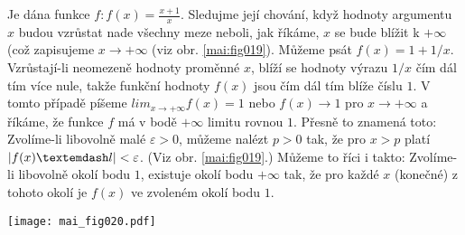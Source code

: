 \wikitextrule
\begin{example}\label{MAI:exam031}
  Je dána funkce \(f: f(x) = \frac{x + 1}{x}\). Sledujme její chování, když hodnoty argumentu \(x\) 
  budou vzrůstat nade všechny meze neboli, jak říkáme, \(x\) se bude blížit k \(+\infty\) (což 
  zapisujeme \(x \to + \infty\) (viz obr. \ref{mai:fig019}). Můžeme psát \(f(x) = 1 + 1/x\). 
  Vzrůstají-li neomezeně hodnoty proměnné \(x\), blíží se hodnoty výrazu \(1/x\) čím dál tím více 
  nule, takže funkční hodnoty \(f(x)\) jsou čím dál tím blíže číslu \(1\). V tomto případě píšeme 
  \(lim_{x\to+\infty}f(x) = 1\) nebo \(f(x) \to 1\) pro \(x\to +\infty\) a říkáme, že funkce \(f\) 
  má v bodě \(+\infty\) limitu rovnou \(1\). Přesně to znamená toto: Zvolíme-li libovolně malé 
  \(\varepsilon > 0\), můžeme nalézt \(p > 0\) tak, že pro \(x > p\) platí \(\abs{f(x) — l} < 
  \varepsilon\). (Viz obr. \ref{mai:fig019}.) Můžeme to říci i takto: Zvolíme-li libovolně okolí 
  bodu \(1\), existuje okolí bodu \(+\infty\) tak, že pro každé \(x\) (konečné) z tohoto okolí je 
  \(f(x)\) ve zvoleném okolí bodu \(1\).
  
  {\centering
   \captionsetup{type=figure}
%   
   \texttt{[image: mai\_fig020.pdf]}
  \par}
\end{example}















